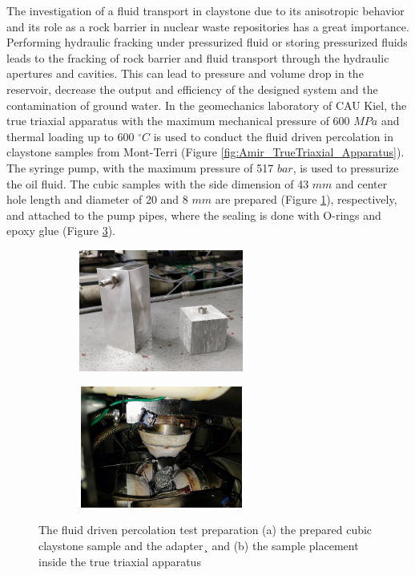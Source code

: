 The investigation of a fluid transport in claystone due to its anisotropic behavior and its role as a rock barrier in nuclear waste repositories has a great importance. Performing hydraulic fracking under pressurized fluid or storing pressurized fluids leads to the fracking of rock barrier and fluid transport through the hydraulic apertures and cavities. This can lead to pressure and volume drop in the reservoir, decrease the output and efficiency of the designed system and the contamination of ground water. In the geomechanics laboratory of CAU Kiel, the true triaxial apparatus with the maximum mechanical pressure of 600 $MPa$ and thermal loading up to 600 $^{\circ}C$ is used to conduct the fluid driven percolation in claystone samples from Mont-Terri (Figure \ref{fig:Amir_TrueTriaxial_Apparatus}). The syringe pump, with the maximum pressure of 517 $bar$, is used to pressurize the oil fluid. The cubic samples with the side dimension of 43 $mm$ and center hole length and diameter of 20 and 8 $mm$ are prepared (Figure \ref{fig:Amir_Percolation_Adapter}), respectively, and attached to the pump pipes, where the sealing is done with O-rings and epoxy glue (Figure \ref{fig:Amir_Percolation_Setup}). 

\begin{figure}[!ht]
\begin{subfigure}[c]{0.48\textwidth}
\includegraphics[width=6cm,height=4cm]{figures/Amir_Percolation_Adapter.png}
\subcaption{}
\label{fig:Amir_Percolation_Adapter}
\end{subfigure}
\hfill
\begin{subfigure}[c]{0.48\textwidth}
\includegraphics[width=6cm,height=4cm]{figures/Amir_Percolation_Setup.png}
\subcaption{}
\label{fig:Amir_Percolation_Setup}
\end{subfigure}
\caption{The fluid driven percolation test preparation (a) the prepared cubic claystone sample and the adapter¸ and (b) the sample placement inside the true triaxial apparatus}
\end{figure}

